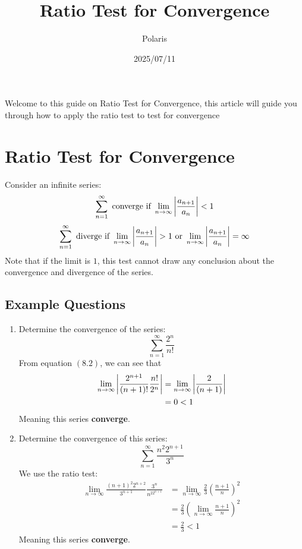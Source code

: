 \documentclass{article}
\title{Ratio Test for Convergence}
\author{Polaris}
\date{2025/07/11}
\numberwithin{equation}{section}
\begin{document}
\maketitle

Welcome to this guide on Ratio Test for Convergence, this article will guide you through how to apply the ratio test to test for convergence

\section{Ratio Test for Convergence}
Consider an infinite series:
\begin{equation}
    \sum_{n = 1}^{\infty} \text{ converge if } \lim_{n\to \infty} \abs{\frac{a_{n+1}}{a_n}} < 1
\end{equation}
\begin{equation}
    \sum_{n = 1}^{\infty} \text{ diverge if } \lim_{n\to \infty} \abs{\frac{a_{n+1}}{a_n}} > 1 \text{ or } \lim_{n\to \infty} \abs{\frac{a_{n+1}}{a_n}} = \infty
\end{equation}
Note that if the limit is $1$, this test cannot draw any conclusion about the convergence and divergence of the series.

\subsection{Example Questions}
\begin{enumerate}
    \item Determine the convergence of the series:
    \[
        \sum_{n = 1}^{\infty} \frac{2^n}{n!}
    \]
    From equation $(8.2)$, we can see that
    \[
        \begin{split}
            \lim_{n\to \infty} \abs{\frac{2^{n+1}}{(n+1)!} \frac{n!}{2^n}} &= \lim_{n\to \infty} \abs{\frac{2}{(n+1)}}\\
            & = 0 < 1
        \end{split}
    \]
    Meaning this series \textbf{converge}.
    \item Determine the convergence of this series:
    \[
        \sum_{n = 1}^{\infty} \frac{n^2 2^{n+1}}{3^n}
    \]
    We use the ratio test:
    \[
        \begin{split}
            \lim_{n\to \infty} \frac{(n+1)^2 2^{n+2}}{3^{n+1}} \frac{3^n}{n^22^{n+1}} & = \lim_{n\to \infty} \frac{2}{3} \left(\frac{n+1}{n}\right)^2\\
            & = \frac{2}{3} \left(\lim_{n\to\infty} \frac{n+1}{n}\right)^2\\
            & = \frac{2}{3} < 1
        \end{split}
    \]
    Meaning this series \textbf{converge}.
\end{enumerate}
\end{document}
